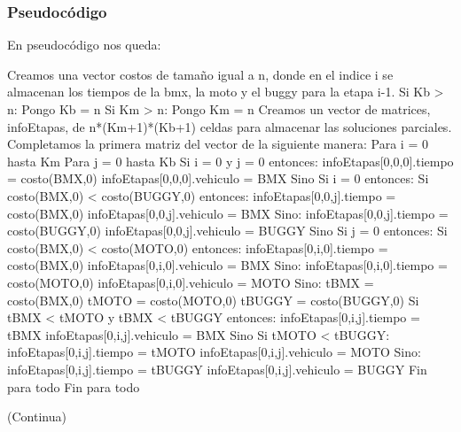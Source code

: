  \subsubsection{Pseudocódigo}
En pseudocódigo nos queda:
\newline \newline
\begin{codesnippet}
Creamos una vector costos de tamaño igual a n, donde en el indice i se almacenan los
    tiempos de la bmx, la moto y el buggy para la etapa i-1.
Si Kb > n:
    Pongo Kb = n
Si Km > n:
    Pongo Km = n
Creamos un vector de matrices, infoEtapas, de n*(Km+1)*(Kb+1) celdas para almacenar
    las soluciones parciales.
Completamos la primera matriz del vector de la siguiente manera:
Para i = 0 hasta Km
    Para j = 0 hasta Kb
    	Si i = 0 y j = 0 entonces:
        	infoEtapas[0,0,0].tiempo = costo(BMX,0)
                infoEtapas[0,0,0].vehiculo = BMX
            Sino Si i = 0 entonces:
         	Si costo(BMX,0) < costo(BUGGY,0) entonces:
            	infoEtapas[0,0,j].tiempo = costo(BMX,0)
	            infoEtapas[0,0,j].vehiculo = BMX
		 Sino:
            	infoEtapas[0,0,j].tiempo = costo(BUGGY,0)
	            infoEtapas[0,0,j].vehiculo = BUGGY
             Sino Si j = 0 entonces:
         	Si costo(BMX,0) < costo(MOTO,0) entonces:
            	infoEtapas[0,i,0].tiempo = costo(BMX,0)
	            infoEtapas[0,i,0].vehiculo = BMX
	         Sino:
            	infoEtapas[0,i,0].tiempo = costo(MOTO,0)
		    infoEtapas[0,i,0].vehiculo = MOTO
             Sino:
                tBMX = costo(BMX,0)
                tMOTO = costo(MOTO,0)
                tBUGGY = costo(BUGGY,0)
        	Si tBMX < tMOTO y tBMX < tBUGGY  entonces:
            	infoEtapas[0,i,j].tiempo = tBMX
	            infoEtapas[0,i,j].vehiculo = BMX
	        Sino Si tMOTO < tBUGGY:
            	infoEtapas[0,i,j].tiempo = tMOTO
                    infoEtapas[0,i,j].vehiculo = MOTO
                Sino:
                   infoEtapas[0,i,j].tiempo = tBUGGY
	           infoEtapas[0,i,j].vehiculo = BUGGY
    Fin para todo
Fin para todo

  								(Continua)
\end{codesnippet}
